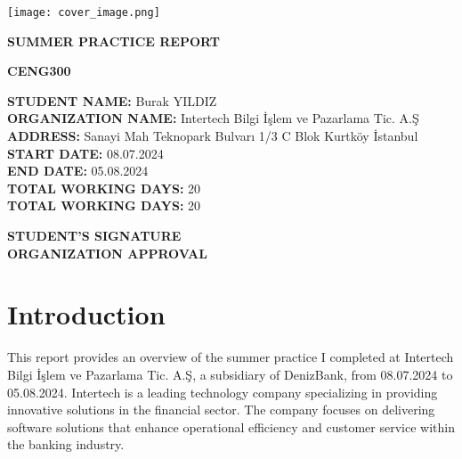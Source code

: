 \documentclass[a4paper,12pt]{report}
\begin{document}
\begin{titlepage}
    \centering
    \texttt{[image: cover\_image.png]} %
    
    \vspace*{1cm}

    \Huge
    \textbf{SUMMER PRACTICE REPORT}

    \vspace{1.5cm}

    \LARGE
    \textbf{CENG300}
    
    \vfill

    \RaggedRight
    \large
    \textbf{STUDENT NAME:} Burak YILDIZ \\
    \textbf{ORGANIZATION NAME:} Intertech Bilgi İşlem ve Pazarlama Tic. A.Ş \\
    \textbf{ADDRESS:} Sanayi Mah Teknopark Bulvarı 1/3 C Blok Kurtköy İstanbul \\
    \textbf{START DATE:} 08.07.2024 \\
    \textbf{END DATE:} 05.08.2024 \\
    \textbf{TOTAL WORKING DAYS:} 20 \\
    \textbf{TOTAL WORKING DAYS:} 20 \\
    \vfill

    \begin{multicols}{2}
        \raggedright \textbf{STUDENT’S SIGNATURE} \\
        \raggedleft \textbf{ORGANIZATION APPROVAL}
    \end{multicols}

    \vfill
\end{titlepage}

\tableofcontents
\newpage

\chapter{Introduction}
This report provides an overview of the summer practice I completed at Intertech Bilgi İşlem ve Pazarlama Tic. A.Ş, a subsidiary of DenizBank, from 08.07.2024 to 05.08.2024. Intertech is a leading technology company specializing in providing innovative solutions in the financial sector. The company focuses on delivering software solutions that enhance operational efficiency and customer service within the banking industry.
\end{document}
